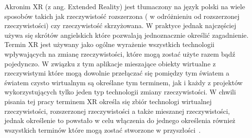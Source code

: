 	Akronim XR (z ang. Extended Reality) jest tłumaczony na język polski na wiele sposobów takich jak rzeczywistość rozszerzona ( w odróżnieniu od rozszerzonej rzeczywistości) czy rzeczywistość skrzyżowana. W praktyce jednak najczęściej używa się skrótów angielskich które pozwalają jednoznacznie określić zagadnienie. Termin XR jest używany jako ogólne wyrażenie wszystkich technologii wpływających na zmianę rzeczywistości, które mogą zostać użyte razem bądź pojedynczo. W związku z tym aplikacje mieszające obiekty wirtualne z rzeczywistymi które mogą dowolnie przełączać się pomiędzy tym światem a światem czysto wirtualnym są określane tym terminem, jak i każdy z projektów wykorzystujących tylko jeden typ technologii zmiany rzeczywistości. W chwili pisania tej pracy terminem XR określa się zbiór technologi wirtualnej rzeczywistości, rozszerzonej rzeczywistości a także mieszanej rzeczywistości, jednak określenie to powstało w celu włączenia do jednego określenia również wszystkich terminów które mogą zostać stworzone w przyszłości~\cite{terms}.
	
